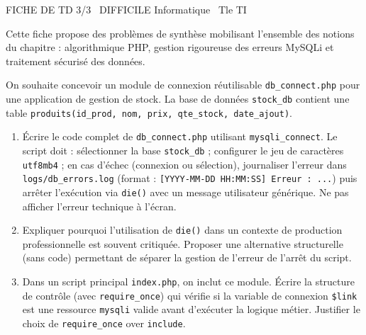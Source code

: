 \documentclass[11pt]{article}
\begin{document}
\begin{tcolorbox}[enhanced,colback=popink,colframe=popink,arc=10pt,boxrule=0pt,left=12pt,right=12pt,top=9pt,bottom=9pt]
{\color{white}\popxbold\small FICHE DE TD 3/3 \textbullet\ DIFFICILE \hfill Informatique \textbullet\ Tle TI\par}
\end{tcolorbox}
\vspace{4pt}
Cette fiche propose des problèmes de synthèse mobilisant l'ensemble des notions du chapitre : algorithmique PHP, gestion rigoureuse des erreurs MySQLi et traitement sécurisé des données.

\begin{exercice}
On souhaite concevoir un module de connexion réutilisable \texttt{db\_connect.php} pour une application de gestion de stock. La base de données \texttt{stock\_db} contient une table \texttt{produits(id\_prod, nom, prix, qte\_stock, date\_ajout)}.

\begin{enumerate}
    \item Écrire le code complet de \texttt{db\_connect.php} utilisant \texttt{mysqli\_connect}. Le script doit : sélectionner la base \texttt{stock\_db} ; configurer le jeu de caractères \texttt{utf8mb4} ; en cas d'échec (connexion ou sélection), journaliser l'erreur dans \texttt{logs/db\_errors.log} (format : \texttt{[YYYY-MM-DD HH:MM:SS] Erreur : ...}) puis arrêter l'exécution via \texttt{die()} avec un message utilisateur générique. Ne pas afficher l'erreur technique à l'écran.
    \item Expliquer pourquoi l'utilisation de \texttt{die()} dans un contexte de production professionnelle est souvent critiquée. Proposer une alternative structurelle (sans code) permettant de séparer la gestion de l'erreur de l'arrêt du script.
    \item Dans un script principal \texttt{index.php}, on inclut ce module. Écrire la structure de contrôle (avec \texttt{require\_once}) qui vérifie si la variable de connexion \texttt{\$link} est une ressource \texttt{mysqli} valide avant d'exécuter la logique métier. Justifier le choix de \texttt{require\_once} over \texttt{include}.
\end{enumerate}
\end{exercice}
\end{document}
